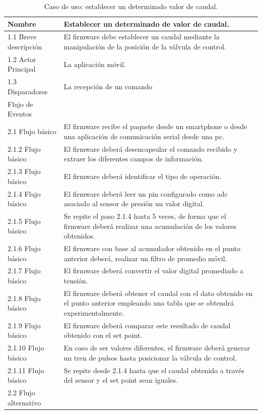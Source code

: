 \begin{table}[htpb]
\begin{center}
\caption{ Caso de uso: establecer un determinado valor de caudal.}
\begin{tabular}{ | m{4cm} | m{9cm} | }
\hline 
Nombre & Establecer un determinado de valor de caudal.\\ \hline
1.1 Breve descripción &
El firmware debe establecer un caudal mediante la manipulación de la posición de la válvula de control.\\ \hline
 1.2 Actor Principal & La aplicación móvil.\\ \hline
 1.3 Disparadores & La recepción de un comando \\ \hline
Flujo de Eventos & \\ \hline


 2.1 Flujo básico &
El firmware recibe el paquete desde un smartphone  o desde una aplicación de comunicación serial desde una pc. \\ \hline
 2.1.2 Flujo básico &
El firmware deberá desencapsular el comando recibido y extraer los diferentes campos de información. \\ \hline
 2.1.3 Flujo básico &
El firmware deberá identificar el tipo de operación. \\ \hline


 2.1.4 Flujo básico &
El firmware deberá leer un pin configurado como adc asociado al sensor de presión un valor digital. \\ \hline


2.1.5 Flujo básico &
Se repite el paso 2.1.4 hasta 5 veces, de forma que el firmware deberá realizar una acumulación de los valores obtenidos.\\ \hline
2.1.6 Flujo básico &
 El firmware con base al acumulador obtenido en el punto anterior deberá, realizar un filtro de promedio móvil.  \\ \hline
2.1.7 Flujo básico & 
El firmware deberá convertir el valor digital promediado a tensión.  \\ \hline
2.1.8 Flujo básico & 
El firmware deberá obtener el caudal con el dato obtenido en el punto anterior empleando una tabla que se obtendrá experimentalmente. \\ \hline
2.1.9 Flujo básico &
El firmware deberá comparar este resultado de caudal obtenido con el set point. \\ \hline
2.1.10 Flujo básico &
En caso de ser valores diferentes, el firmware deberá generar un tren de pulsos hasta posicionar la válvula de control. \\ \hline
2.1.11 Flujo básico &
Se repite desde 2.1.4 hasta que el caudal obtenido a través del sensor y el set point sean iguales. \\ \hline
2.2 Flujo alternativo & \\ \hline



\end{tabular}
\end{center}
\end{table}
